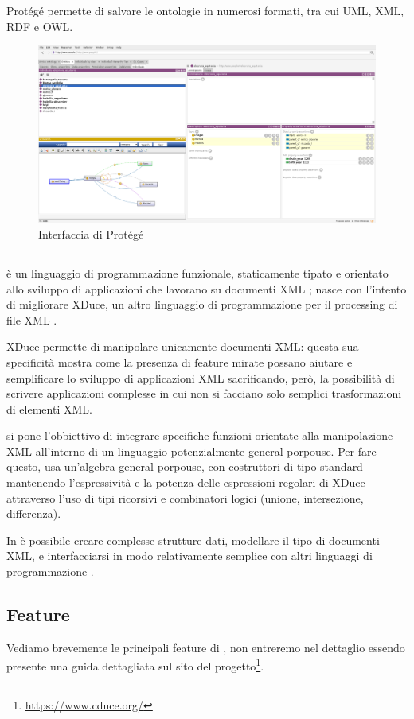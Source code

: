 Protégé permette di salvare le ontologie in numerosi formati, tra cui UML, XML, RDF e OWL.
\begin{figure}[h]
	\centering
	\includegraphics[width=\textwidth]{Picture/interface_protege.png}
	\caption{Interfaccia di Protégé}
\end{figure}
\subsection{\cduce}\label{cduce_intro}
\cduce è un linguaggio di programmazione funzionale, staticamente tipato e orientato allo sviluppo di applicazioni che lavorano su documenti XML \cite{cduceLanguage}; nasce con l'intento di migliorare XDuce, un altro linguaggio di programmazione per il processing di file XML \cite{hosoya2003xduce}. 

XDuce permette di manipolare unicamente documenti XML: questa sua specificità mostra come la presenza di feature mirate possano aiutare e semplificare lo sviluppo di applicazioni XML sacrificando, però, la possibilità di scrivere applicazioni complesse in cui non si facciano solo semplici trasformazioni di elementi XML.

\cduce si pone l'obbiettivo di integrare specifiche funzioni orientate alla manipolazione XML all'interno di un linguaggio potenzialmente general-porpouse. Per fare questo, \cduce usa un'algebra general-porpouse, con costruttori di tipo standard mantenendo l'espressività e la potenza delle espressioni regolari di XDuce attraverso l'uso di tipi ricorsivi e combinatori logici (unione, intersezione, differenza).

In \cduce è possibile creare complesse strutture dati, modellare il tipo di documenti XML, e interfacciarsi in modo relativamente semplice con altri linguaggi di programmazione \cite{cduceLanguage}.
\subsection{Feature}\label{fature_cduce}
Vediamo brevemente le principali feature di \cduce, non entreremo nel dettaglio essendo presente una guida dettagliata sul sito del progetto\footnote{\url{https://www.cduce.org/}}.
